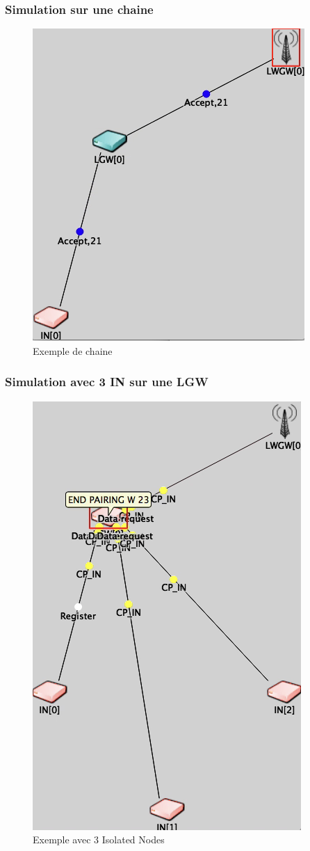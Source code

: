 \documentclass[11pt]{article}
\begin{document}
\subsubsection{Simulation sur une chaine}
\begin{figure}[!ht]
\centering
\includegraphics[scale=0.6]{chaine.png} 
\caption{Exemple de chaine}
\end{figure}
\newpage
\subsubsection{Simulation avec 3 IN sur une LGW}
\begin{figure}[!ht]
\centering
\includegraphics[scale=0.6]{3IN.png} 
\caption{Exemple avec 3 Isolated Nodes}
\end{figure}
\newpage
\end{document}
